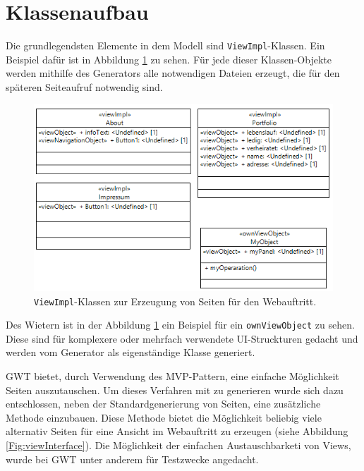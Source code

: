 \newpage
\section{Klassenaufbau}
Die grundlegendsten Elemente in dem Modell sind \texttt{ViewImpl}-Klassen. Ein
Beispiel dafür ist in Abbildung \ref{Fig:viewimpl} zu sehen. Für jede dieser
Klassen-Objekte werden mithilfe des Generators alle notwendigen Dateien
erzeugt, die für den späteren Seiteaufruf notwendig sind.

\begin{figure}[htbp]
\begin{center}
\includegraphics[width=1.0\textwidth]{./img/GWT-Model-Views-alg.png}
\caption{\texttt{ViewImpl}-Klassen zur Erzeugung von Seiten
für den Webauftritt.}\label{Fig:viewimpl}
\end{center}
\end{figure}

Des Wietern ist in der Abbildung \ref{Fig:viewimpl} ein Beispiel für ein
\texttt{ownViewObject} zu sehen. Diese sind für komplexere oder mehrfach
verwendete UI-Struckturen gedacht und werden vom Generator als eigenständige
Klasse generiert.

GWT bietet, durch Verwendung des MVP-Pattern, eine einfache Möglichkeit Seiten
auszutauschen. Um dieses Verfahren mit zu generieren wurde sich dazu
entschlossen, neben der Standardgenerierung von Seiten, eine zusätzliche
Methode einzubauen. Diese Methode bietet die Möglichkeit beliebig viele
alternativ Seiten für eine Ansicht im Webauftritt zu erzeugen (siehe Abbildung
\ref{Fig:viewInterface}). Die Möglichkeit der einfachen Austauschbarketi von
Views, wurde bei GWT unter anderem für Testzwecke angedacht.


